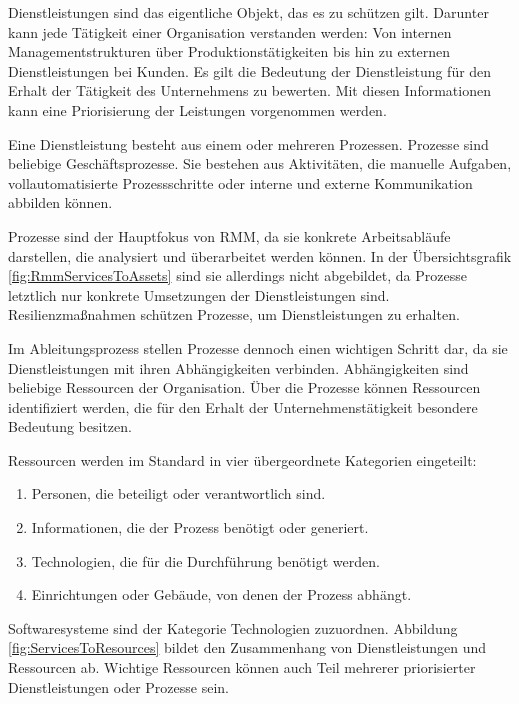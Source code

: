 \documentclass[]{lni}
\begin{document}
Dienstleistungen sind das eigentliche Objekt, das es zu schützen gilt. Darunter kann jede Tätigkeit einer Organisation verstanden werden: Von internen Managementstrukturen über Produktionstätigkeiten bis hin zu externen Dienstleistungen bei Kunden. Es gilt die Bedeutung der Dienstleistung für den Erhalt der Tätigkeit des Unternehmens zu bewerten. Mit diesen Informationen kann eine Priorisierung der Leistungen vorgenommen werden.

Eine Dienstleistung besteht aus einem oder mehreren Prozessen. Prozesse sind beliebige Geschäftsprozesse. Sie bestehen aus Aktivitäten, die manuelle Aufgaben, vollautomatisierte Prozessschritte oder interne und externe Kommunikation abbilden können.

Prozesse sind der Hauptfokus von RMM, da sie konkrete Arbeitsabläufe darstellen, die analysiert und überarbeitet werden können. In der Übersichtsgrafik \ref{fig:RmmServicesToAssets} sind sie allerdings nicht abgebildet, da Prozesse letztlich \glqq nur\grqq{} konkrete Umsetzungen der Dienstleistungen sind. Resilienzmaßnahmen schützen Prozesse, um Dienstleistungen zu erhalten.

Im Ableitungsprozess stellen Prozesse dennoch einen wichtigen Schritt dar, da sie Dienstleistungen mit ihren Abhängigkeiten verbinden. Abhängigkeiten sind beliebige Ressourcen der Organisation. Über die Prozesse können Ressourcen identifiziert werden, die für den Erhalt der Unternehmenstätigkeit besondere Bedeutung besitzen.

Ressourcen werden im Standard in vier übergeordnete Kategorien eingeteilt:

\begin{enumerate}
    \item Personen, die beteiligt oder verantwortlich sind.
    \item Informationen, die der Prozess benötigt oder generiert.
    \item Technologien, die für die Durchführung benötigt werden.
    \item Einrichtungen oder Gebäude, von denen der Prozess abhängt.
\end{enumerate}

Softwaresysteme sind der Kategorie \glqq Technologien\grqq{} zuzuordnen. Abbildung \ref{fig:ServicesToResources} bildet den Zusammenhang von Dienstleistungen und Ressourcen ab. Wichtige Ressourcen können auch Teil mehrerer priorisierter Dienstleistungen oder Prozesse sein.
\end{document}
